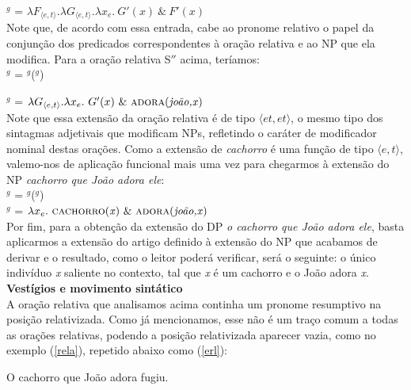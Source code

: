 \n {}$^{g}$ = $\lambda F_{\langle
e,t\rangle}.\lambda G_{\langle e,t\rangle}.\lambda x_{e}.\ G'(x)\ \&\ F'(x)$\\

\n Note que, de acordo com essa entrada, cabe ao pronome relativo o papel da conjunção dos predicados correspondentes à oração relativa e ao NP que ela modifica. Para a oração relativa S$''$ acima, teríamos:\\

\n{}$^{g}$ = $^{g}$($^{g}$)

\n \n {}$^{g}$ = $\lambda G_{\langle e,t\rangle}.\lambda
x_{e}.\ G'(x)\ \&\ \text{\textsc{adora}(\textit{joão,x})}$\\

\n Note que essa extensão da oração relativa é de tipo $\langle et,et\rangle$, o mesmo tipo dos sintagmas adjetivais que modificam NPs, refletindo o caráter de modificador nominal destas orações. Como a extensão de \textit{cachorro} é uma função de tipo
$\langle e,t\rangle$, valemo-nos de aplicação funcional mais uma
vez para chegarmos à extensão do NP \textit{cachorro que João
adora ele}:\\

\n{}$^{g}$ = $^{g}$($^{g}$)\\
$^{g}$ = $\lambda x_{e}.\ \predica{cachorro}{x}\ \&\
\predica{adora}{joão,x}$\\

\n Por fim, para a obtenção da extensão do DP \textit{o cachorro
que João adora ele}, basta aplicarmos a extensão do artigo definido
à extensão do NP que acabamos de derivar e o resultado, como o
leitor poderá verificar, será o seguinte: o único indivíduo
\textit{x} saliente no contexto, tal que \textit{x} é um cachorro
e o João adora \textit{x}.  \\

\n \textbf{Vestígios e movimento sintático} \\

\n A oração relativa que analisamos acima continha um pronome
resumptivo na posição relativizada. Como já mencionamos, esse não
é um traço comum a todas as orações relativas, podendo a posição
relativizada aparecer vazia, como no exemplo (\ref{rela}),
repetido abaixo como (\ref{erl}):

\begin{exe}
    \ex O cachorro que João adora fugiu. \label{erl}
\end{exe}

